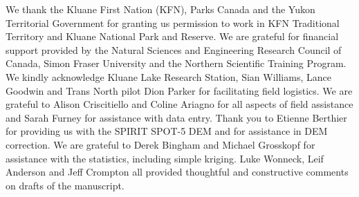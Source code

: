 \documentclass[twocolumn,letterpaper]{igs}
\begin{document}
We thank the Kluane First Nation (KFN), Parks Canada and the Yukon Territorial Government for granting us permission to work in KFN Traditional Territory and Kluane National Park and Reserve. We are grateful for financial support provided by the Natural Sciences and Engineering Research Council of  Canada, Simon Fraser University and the Northern Scientific  Training  Program. We kindly acknowledge Kluane Lake Research Station, Sian Williams, Lance Goodwin and Trans North pilot Dion Parker for facilitating field logistics. We are grateful to Alison Criscitiello and Coline Ariagno for all aspects of field assistance and Sarah Furney for assistance with data entry. Thank you to Etienne Berthier for providing us with the SPIRIT SPOT-5 DEM and for assistance in DEM correction. We are grateful to Derek Bingham and Michael Grosskopf for assistance with the statistics, including simple kriging. Luke Wonneck, Leif Anderson and Jeff Crompton all provided thoughtful and constructive comments on drafts of the manuscript.


%
%

%


\end{document}

